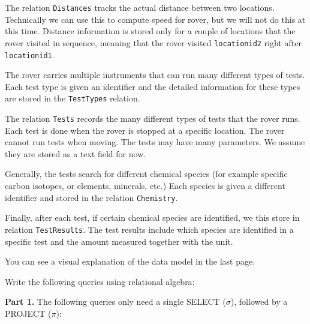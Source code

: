\documentclass[11pt]{article}
\begin{document}
The relation {\tt Distances} tracks the actual distance between two
locations. Technically we can use this to compute speed for rover, but
we will not do this at this time. Distance information is stored only
for a couple of locations that the rover visited in sequence, meaning
that the rover visited \verb+locationid2+ right after
\verb+locationid1+.

The rover carries multiple instruments that can run many different
types of tests. Each test type is given an identifier and the detailed
information for these types are stored in the {\tt TestTypes} relation.

The relation {\tt Tests} records the many different types of tests that
the rover runs. Each test is done when the rover is stopped at a
specific location. The rover cannot run tests when moving. The tests
may have many parameters. We assume they are stored as a text field
for now.

Generally, the tests search for different chemical species (for
example specific carbon isotopes, or elements, minerals, etc.) Each
species is given a different identifier and stored in the relation
{\tt Chemistry}.

Finally, after each test, if certain chemical species are identified,
we this store in relation {\tt TestResults}. The test results include
which species are identified in a specific test and the amount
measured together with the unit.

You can see a visual explanation of the data model in the last page.

\newpage

Write the following queries using relational algebra:

{\bf Part 1.} The following queries only need a single SELECT
($\sigma$), followed by a PROJECT ($\pi$):
\end{document}
